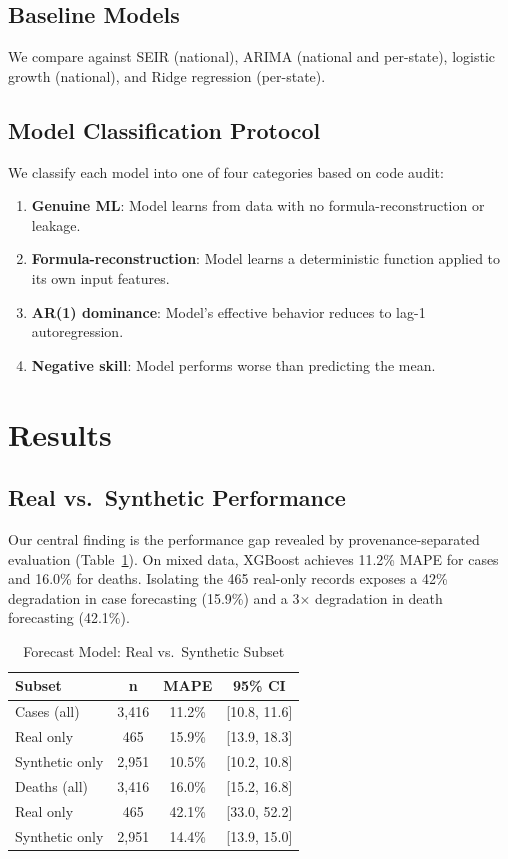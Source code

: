 \documentclass{ieeeaccess}
\begin{document}
\subsection{Baseline Models}
We compare against SEIR (national), ARIMA (national and per-state), logistic growth (national), and Ridge regression (per-state).

\subsection{Model Classification Protocol}
We classify each model into one of four categories based on code audit:
\begin{enumerate}
    \item \textbf{Genuine ML}: Model learns from data with no formula-reconstruction or leakage.
    \item \textbf{Formula-reconstruction}: Model learns a deterministic function applied to its own input features.
    \item \textbf{AR(1) dominance}: Model's effective behavior reduces to lag-1 autoregression.
    \item \textbf{Negative skill}: Model performs worse than predicting the mean.
\end{enumerate}

\section{Results}
\label{sec:results}

\subsection{Real vs.\ Synthetic Performance}
\label{sec:real_synth}

Our central finding is the performance gap revealed by provenance-separated evaluation (Table~\ref{tab:real_synth}). On mixed data, XGBoost achieves 11.2\% MAPE for cases and 16.0\% for deaths. Isolating the 465 real-only records exposes a 42\% degradation in case forecasting (15.9\%) and a 3$\times$ degradation in death forecasting (42.1\%).

\begin{table}[h]
\centering
\caption{Forecast Model: Real vs.\ Synthetic Subset}
\label{tab:real_synth}
\small
\begin{tabular}{lccc}
\toprule
Subset & n & MAPE & 95\% CI \\
\midrule
Cases (all) & 3,416 & 11.2\% & [10.8, 11.6] \\
\quad Real only & 465 & 15.9\% & [13.9, 18.3] \\
\quad Synthetic only & 2,951 & 10.5\% & [10.2, 10.8] \\
\addlinespace
Deaths (all) & 3,416 & 16.0\% & [15.2, 16.8] \\
\quad Real only & 465 & 42.1\% & [33.0, 52.2] \\
\quad Synthetic only & 2,951 & 14.4\% & [13.9, 15.0] \\
\bottomrule
\end{tabular}
\end{table}
\end{document}
